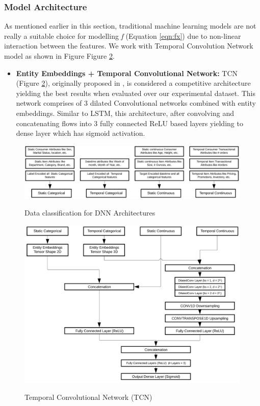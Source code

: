 \subsubsection{Model Architecture}
As mentioned earlier in this section, traditional machine learning models are not really a suitable choice for modelling \emph{f} 
(Equation \ref{eqn:fx}) due to non-linear interaction between the features.
We work with Temporal Convolution Network model as shown in Figure Figure \ref{fig:TCN}.
\begin{itemize}
\item {\bf Entity Embeddings + Temporal Convolutional Network:} TCN (Figure \ref{fig:TCN}), originally
proposed in \cite{lea2016temporal} , is considered a competitive architecture yielding the best results when evaluated over 
our experimental dataset. This network comprises of 3 dilated Convolutional networks combined with entity embeddings.
Similar to LSTM, this architecture, after convolving and concatenating flows into 
3 fully connected ReLU based layers yielding to dense layer which has sigmoid activation.
\end{itemize}
\begin{figure}[t]
    \centering 
    \caption{Data classification for DNN Architectures} 
    \includegraphics[width=4.4in]{img/dnndata.png} 
    \label{fig:dnndata} 
  \end{figure}
  \begin{figure}[t]
    \centering 
    \caption{Temporal Convolutional Network (TCN)} 
    \includegraphics[width=4.4in]{img/TCN.png} 
    \label{fig:TCN} 
  \end{figure}
